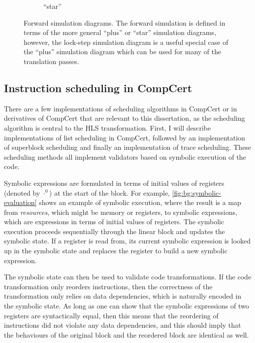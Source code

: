 \begin{figure}
\begin{subfigure}[b]{0.31\linewidth}
    \caption{\enquote{star}}
  \end{subfigure}
  \caption[Examples of forward simulation diagrams.]{Forward simulation
    diagrams.  The forward simulation is defined in terms of the more general
    \enquote{plus} or \enquote{star} simulation diagrams, however, the lock-step
  simulation diagram is a useful special case of the \enquote{plus} simulation
  diagram which can be used for many of the translation passes.}%
  \label{fig:bg:forwards-simulation-diagram}
\end{figure}

\subsection{Instruction scheduling in CompCert}%
\label{sec:bg:instruction-scheduling-compcert}

There are a few implementations of scheduling algorithms in CompCert or in
derivatives of CompCert that are relevant to this dissertation, as the
scheduling algorithm is central to the \gls{HLS} transformation.  First, I will
describe implementations of list scheduling in CompCert, followed by an
implementation of superblock scheduling and finally an implementation of trace
scheduling.  These scheduling methods all implement validators based on symbolic
execution of the code.

Symbolic expressions are formulated in terms of initial values of registers (denoted by $\cdot^0$) at
the start of the block.  For example, \cref{fig:bg:symbolic-evaluation} shows an
example of symbolic execution, where the result is a map from \emph{resources},
which might be memory or registers, to symbolic expressions, which are
expressions in terms of initial values of registers.  The symbolic execution
proceeds sequentially through the linear block and updates the symbolic state.
If a register is read from, its current symbolic expression is looked up in the
symbolic state and replaces the register to build a new symbolic expression.

The symbolic state can then be used to validate code transformations.  If the
code transformation only reorders instructions, then the correctness of the
transformation only relies on data dependencies, which is naturally encoded in
the symbolic state.  As long as one can show that the symbolic expressions of
two registers are syntactically equal, then this means that the reordering
of instructions did not violate any data dependencies, and this should imply
that the behaviours of the original block and the reordered block are identical
as well.

